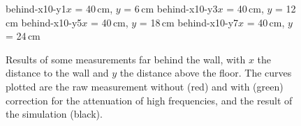 \begin{figure}
\figOctaveTwoNoFigNoCaption{-0.0cm}
	{behind-x10-y1}{$x$ = 40\,cm, $y$ = 6\,cm}
	{behind-x10-y3}{$x$ = 40\,cm, $y$ = 12\,cm}
\figOctaveTwoNoFigNoCaption{-0.0cm}
	{behind-x10-y5}{$x$ = 40\,cm, $y$ = 18\,cm}
	{behind-x10-y7}{$x$ = 40\,cm, $y$ = 24\,cm}
\caption{Results of some measurements far behind the wall, with $x$ the distance to the wall and $y$ the distance above the floor. The curves plotted are the raw measurement without (red) and with (green) correction for the attenuation of high frequencies, and the result of the simulation (black). \label{behindFar}}
\end{figure}






